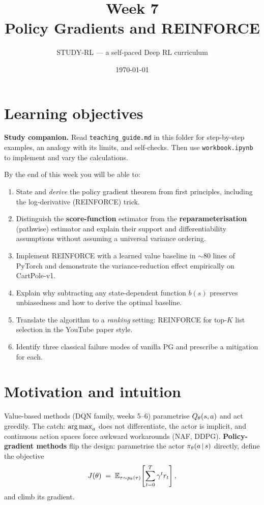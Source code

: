 \documentclass[11pt,oneside]{scrbook}
\title{{\color{rlblue}\textbf{Week 7} \\ \Huge Policy Gradients and REINFORCE}}
\author{STUDY-RL --- a self-paced Deep RL curriculum}
\date{\today}
\begin{document}
\maketitle
\tableofcontents
\newpage

\chapter*{Learning objectives}


\noindent\textbf{Study companion.} Read \texttt{teaching\_guide.md} in this
folder for step-by-step examples, an analogy with its limits, and self-checks.
Then use \texttt{workbook.ipynb} to implement and vary the calculations.
\par\medskip

\begin{keyidea}
By the end of this week you will be able to:
\begin{enumerate}[leftmargin=*]
  \item State and \emph{derive} the policy gradient theorem from first principles, including the log-derivative (REINFORCE) trick.
  \item Distinguish the \textbf{score-function} estimator from the \textbf{reparameterisation} (pathwise) estimator and explain their support and differentiability assumptions without assuming a universal variance ordering.
  \item Implement REINFORCE with a learned value baseline in $\sim$80 lines of PyTorch and demonstrate the variance-reduction effect empirically on CartPole-v1.
  \item Explain why subtracting any state-dependent function $b(s)$ preserves unbiasedness and how to derive the optimal baseline.
  \item Translate the algorithm to a \emph{ranking} setting: REINFORCE for top-$K$ list selection in the YouTube paper style.
  \item Identify three classical failure modes of vanilla PG and prescribe a mitigation for each.
\end{enumerate}
\end{keyidea}

\chapter{Motivation and intuition}

Value-based methods (DQN family, weeks 5--6) parametrise $Q_\theta(s,a)$ and act greedily. The catch: $\operatorname*{arg\,max}_a$ does not differentiate, the actor is implicit, and continuous action spaces force awkward workarounds (NAF, DDPG). \textbf{Policy-gradient methods} flip the design: parametrise the actor $\pi_\theta(a \,\vert\, s)$ directly, define the objective
\[
  J(\theta) \;=\; \mathbb{E}_{\tau \sim p_\theta(\tau)}\!\left[\sum_{t=0}^{T} \gamma^t r_t\right],
\]
and climb its gradient.
\end{document}
